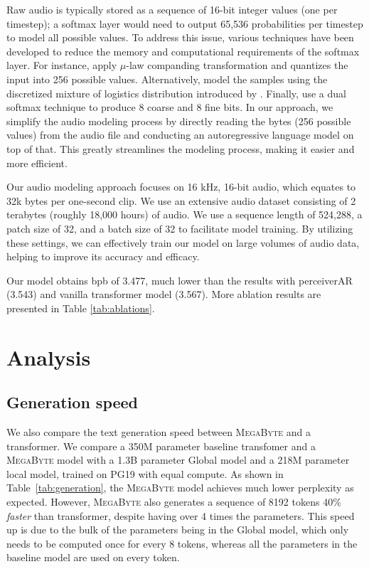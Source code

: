 \documentclass{article}
\newcommand{\fastslow}[0]{\textsc{MegaByte}\xspace}
\newcommand{\megabyte}[0]{\fastslow}
\theoremstyle{plain}
\theoremstyle{definition}
\theoremstyle{remark}
\begin{document}
Raw audio is typically stored as a sequence of 16-bit integer values (one per timestep); a softmax layer would need to output 65,536 probabilities per timestep to model all possible values. To address this issue, various techniques have been developed to reduce the memory and computational requirements of the softmax layer. For instance, \citet{wavenet} apply $\mu$-law companding transformation and quantizes the input into 256 possible values. Alternatively, \citet{parawavenet} model the samples using the discretized mixture of logistics distribution introduced by \citet{pixcelcnn++}. Finally, \citet{wavernn} use a dual softmax technique to produce 8 coarse and 8 fine bits. In our approach, we simplify the audio modeling process by directly reading the bytes (256 possible values) from the audio file and conducting an autoregressive language model on top of that. This greatly streamlines the modeling process, making it easier and more efficient.

Our audio modeling approach focuses on 16 kHz, 16-bit audio, which equates to 32k bytes per one-second clip. We use an extensive audio dataset consisting of 2 terabytes (roughly 18,000 hours) of audio. We use a sequence length of 524,288, a patch size of 32, and a batch size of 32 to facilitate model training. By utilizing these settings, we can effectively train our model on large volumes of audio data, helping to improve its accuracy and efficacy.

Our model obtains bpb of 3.477, much lower than the results with perceiverAR (3.543) and vanilla transformer model (3.567). More ablation results are presented in Table \ref{tab:ablations}. 



\section{Analysis}
\subsection{Generation speed}

We also compare the text generation speed between \megabyte and a transformer. %
We compare a 350M parameter baseline transfomer and a \megabyte model with a 1.3B parameter Global model and a 218M parameter local model, trained on PG19 with equal compute.
As shown in Table~\ref{tab:generation}, the \megabyte model achieves much lower perplexity as expected.
However, \megabyte also generates a sequence of 8192 tokens 40\% \emph{faster} than transformer, despite having over 4 times the parameters.
This speed up is due to the bulk of the parameters being in the Global model, which only needs to be computed once for every 8 tokens, whereas all the parameters in the baseline model are used on every token.
\end{document}
